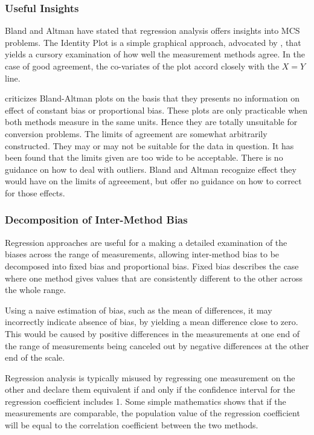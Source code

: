 \documentclass[12pt, a4paper]{report}
\theoremstyle{plain}
\theoremstyle{definition}
\theoremstyle{remark}
\begin{document}
	\subsubsection{Useful Insights}
	Bland and Altman have stated that regression analysis offers insights into MCS problems.
	The Identity Plot is a simple graphical approach, advocated by \citet{BA86}, that yields a cursory examination of how well the measurement methods agree. In the case of good agreement, the co-variates of the plot accord closely with the $X=Y$ line.
	
	
	\citet{ludbrook97,ludbrook02} criticizes Bland-Altman plots on the
	basis that they presents no information on effect of constant bias
	or proportional bias. These plots are only practicable when both
	methods measure in the same units. Hence they are totally
	unsuitable for conversion problems. The limits of agreement are
	somewhat arbitrarily constructed. They may or may not be suitable
	for the data in question. It has been found that the limits given
	are too wide to be acceptable. There is no guidance on how to deal
	with outliers. Bland and Altman recognize effect they would have
	on the limits of agreeement, but offer no guidance on how to
	correct for those effects.	
	
	
	\subsubsection{Decomposition of Inter-Method Bias}
	Regression approaches are useful for a making a detailed examination of the biases across the range of measurements, allowing inter-method bias to be decomposed into fixed bias and proportional bias. Fixed bias describes the case where one method gives values that are consistently different to the other across the whole range. 
	
	
	Using a naive estimation of bias, such as the mean of differences, it may incorrectly indicate absence of bias, by yielding a mean difference close to zero. This would be caused by positive differences in the measurements at one end of the range of measurements being canceled out by negative differences at the other end of the scale.
	
	Regression analysis is typically misused by regressing one measurement on the other and declare them equivalent if and only if the confidence interval for the regression coefficient includes 1. Some simple mathematics shows that if the measurements are comparable, the population value of the regression coefficient will be equal to the correlation coefficient between the two methods. 
	
\end{document}
